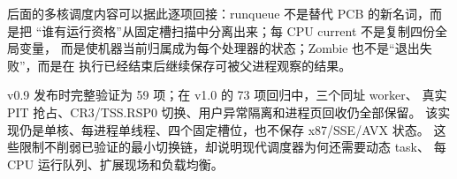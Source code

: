 后面的多核调度内容可以据此逐项回接：runqueue 不是替代 PCB 的新名词，而是把
“谁有运行资格”从固定槽扫描中分离出来；每 CPU current 不是复制四份全局变量，
而是使机器当前归属成为每个处理器的状态；Zombie 也不是“退出失败”，而是在
执行已经结束后继续保存可被父进程观察的结果。

v0.9 发布时完整验证为 59 项；在 v1.0 的 73 项回归中，三个同址 worker、
真实 PIT 抢占、CR3/TSS.RSP0 切换、用户异常隔离和进程页回收仍全部保留。
该实现仍是单核、每进程单线程、四个固定槽位，也不保存 x87/SSE/AVX 状态。
这些限制不削弱已验证的最小切换链，却说明现代调度器为何还需要动态 task、
每 CPU 运行队列、扩展现场和负载均衡。
